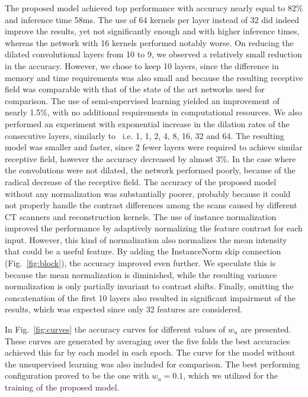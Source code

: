 \documentclass[journal]{IEEEtran}
\begin{document}
\begin{table}[]
\begin{tabular}{@{}llll@{}}
\end{tabular}
\label{II}
\end{table}The proposed model achieved top performance with accuracy nearly equal to 82\% and inference time 58ms. The use of 64 kernels per layer instead of 32 did indeed improve the results, yet not significantly enough and with higher inference times, whereas the network with 16 kernels performed notably worse. On reducing the dilated convolutional layers from 10 to 9, we observed a relatively small reduction in the accuracy. However, we chose to keep 10 layers, since the difference in memory and time requirements was also small and because the resulting receptive field was comparable with that of the state of the art networks used for comparison. The use of semi-supervised learning yielded an improvement of nearly 1.5\%, with no additional requirements in computational resources. We also performed an experiment with exponential increase in the dilation rates of the consecutive layers, similarly to~\cite{YuDilatedSegm} i.e. 1, 1, 2, 4, 8, 16, 32 and 64. The resulting model was smaller and faster, since 2 fewer layers were required to achieve similar receptive field, however the accuracy decreased by almost 3\%. In the case where the convolutions were not dilated, the network performed poorly, because of the radical decrease of the receptive field. The accuracy of the proposed model without any normalization was substantially poorer, probably because it could not properly handle the contrast differences among the scans caused by different CT scanners and reconstruction kernels. The use of instance normalization improved the performance by adaptively normalizing the feature contrast for each input. However, this kind of normalization also normalizes the mean intensity that could be a useful feature. By adding the InstanceNorm skip connection (Fig.~\ref{fig:block}), the accuracy improved even further. We speculate this is because the mean normalization is diminished, while the resulting variance normalization is only partially invariant to contrast shifts. Finally, omitting the concatenation of the first 10 layers also resulted in significant impairment of the results, which was expected since only 32 features are considered. 

In Fig.~\ref{fig:curves} the accuracy curves for different values of $w_u$ are presented. These curves are generated by averaging over the five folds the best accuracies achieved this far by each model in each epoch. The curve for the model without the unsupervised learning was also included for comparison. The best performing configuration proved to be the one with $w_u=0.1$, which we utilized for the training of the proposed model.
\end{document}
